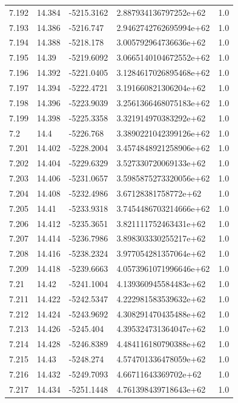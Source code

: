 \begin{tabular}{lllll}
7.192 & 14.384 & -5215.3162 & 2.887934136797252e+62 & 1.0 \\
7.193 & 14.386 & -5216.747 & 2.9462742762695994e+62 & 1.0 \\
7.194 & 14.388 & -5218.178 & 3.005792964736636e+62 & 1.0 \\
7.195 & 14.39 & -5219.6092 & 3.0665140104672552e+62 & 1.0 \\
7.196 & 14.392 & -5221.0405 & 3.1284617026895468e+62 & 1.0 \\
7.197 & 14.394 & -5222.4721 & 3.191660821306204e+62 & 1.0 \\
7.198 & 14.396 & -5223.9039 & 3.2561366468075183e+62 & 1.0 \\
7.199 & 14.398 & -5225.3358 & 3.321914970383292e+62 & 1.0 \\
7.2 & 14.4 & -5226.768 & 3.3890221042399126e+62 & 1.0 \\
7.201 & 14.402 & -5228.2004 & 3.4574848921258906e+62 & 1.0 \\
7.202 & 14.404 & -5229.6329 & 3.527330720069133e+62 & 1.0 \\
7.203 & 14.406 & -5231.0657 & 3.5985875273320056e+62 & 1.0 \\
7.204 & 14.408 & -5232.4986 & 3.67128381758772e+62 & 1.0 \\
7.205 & 14.41 & -5233.9318 & 3.7454486703214666e+62 & 1.0 \\
7.206 & 14.412 & -5235.3651 & 3.821111752463431e+62 & 1.0 \\
7.207 & 14.414 & -5236.7986 & 3.898303330255217e+62 & 1.0 \\
7.208 & 14.416 & -5238.2324 & 3.977054281357064e+62 & 1.0 \\
7.209 & 14.418 & -5239.6663 & 4.0573961071996646e+62 & 1.0 \\
7.21 & 14.42 & -5241.1004 & 4.139360945584483e+62 & 1.0 \\
7.211 & 14.422 & -5242.5347 & 4.222981583539632e+62 & 1.0 \\
7.212 & 14.424 & -5243.9692 & 4.308291470435488e+62 & 1.0 \\
7.213 & 14.426 & -5245.404 & 4.395324731364047e+62 & 1.0 \\
7.214 & 14.428 & -5246.8389 & 4.484116180790388e+62 & 1.0 \\
7.215 & 14.43 & -5248.274 & 4.574701336478059e+62 & 1.0 \\
7.216 & 14.432 & -5249.7093 & 4.66711643369702e+62 & 1.0 \\
7.217 & 14.434 & -5251.1448 & 4.761398439718643e+62 & 1.0 \\

\end{tabular}
